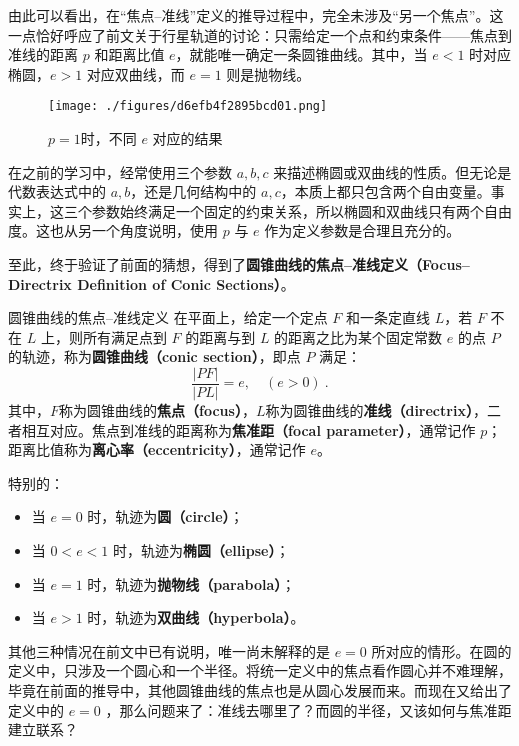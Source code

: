 由此可以看出，在“焦点–准线”定义的推导过程中，完全未涉及“另一个焦点”。这一点恰好呼应了前文关于行星轨道的讨论：只需给定一个点和约束条件——焦点到准线的距离 $p$ 和距离比值 $e$，就能唯一确定一条圆锥曲线。其中，当 $e < 1$ 时对应椭圆，$e > 1$ 对应双曲线，而 $e = 1$ 则是抛物线。

\begin{figure}[ht]
\centering
\texttt{[image: ./figures/d6efb4f2895bcd01.png]}
\caption{$p = 1$时，不同 $e$ 对应的结果} \label{fig_HsCsFD_1}
\end{figure}


在之前的学习中，经常使用三个参数 $a, b, c$ 来描述椭圆或双曲线的性质。但无论是代数表达式中的 $a, b$，还是几何结构中的 $a, c$，本质上都只包含两个自由变量。事实上，这三个参数始终满足一个固定的约束关系，所以椭圆和双曲线只有两个自由度。这也从另一个角度说明，使用 $p$ 与 $e$ 作为定义参数是合理且充分的。

至此，终于验证了前面的猜想，得到了\textbf{圆锥曲线的焦点–准线定义（Focus–Directrix Definition of Conic Sections）}。

\begin{definition}{圆锥曲线的焦点–准线定义}\label{def_HsCsFD_1}
在平面上，给定一个定点 $F$ 和一条定直线 $L$，若 $F$ 不在 $L$ 上，则所有满足点到 $F$ 的距离与到 $L$ 的距离之比为某个固定常数 $e$ 的点 $P$ 的轨迹，称为\textbf{圆锥曲线（conic section）}，即点 $P$ 满足：
\begin{equation}
\frac{|PF|}{|PL|} = e,\quad(e>0)~.
\end{equation}
其中，$F$称为圆锥曲线的\textbf{焦点（focus）}，$L$称为圆锥曲线的\textbf{准线（directrix）}，二者相互对应。焦点到准线的距离称为\textbf{焦准距（focal parameter）}，通常记作 $p$；距离比值称为\textbf{离心率（eccentricity）}，通常记作 $e$。

特别的：
\begin{itemize}
\item 当 $e = 0$ 时，轨迹为\textbf{圆（circle）}；
\item 当 $0 < e < 1$ 时，轨迹为\textbf{椭圆（ellipse）}；
\item 当 $e = 1$ 时，轨迹为\textbf{抛物线（parabola）}；
\item 当 $e > 1$ 时，轨迹为\textbf{双曲线（hyperbola）}。
\end{itemize}
\end{definition}

其他三种情况在前文中已有说明，唯一尚未解释的是 $e = 0$ 所对应的情形。在圆的定义中，只涉及一个圆心和一个半径。将统一定义中的焦点看作圆心并不难理解，毕竟在前面的推导中，其他圆锥曲线的焦点也是从圆心发展而来。而现在又给出了定义中的 $e = 0$ ，那么问题来了：准线去哪里了？而圆的半径，又该如何与焦准距建立联系？

